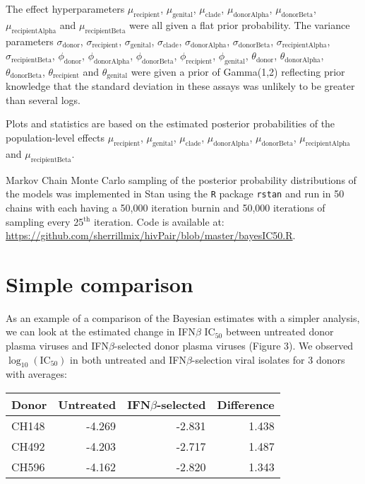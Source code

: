 \documentclass[12pt]{article}
\newcommand{\ifnb}{IFN${\beta}$}
\newcommand{\icFifty}{IC$_{50}$}
\begin{document}
The effect hyperparameters
$\mu_{\text{recipient}}$, $\mu_{\text{genital}}$, $\mu_{\text{clade}}$, $\mu_{\text{donorAlpha}}$, $\mu_{\text{donorBeta}}$, $\mu_{\text{recipientAlpha}}$ and $\mu_{\text{recipientBeta}}$ were all given a flat prior probability.
The variance parameters 
$\sigma_{\text{donor}}$, $\sigma_{\text{recipient}}$, $\sigma_{\text{genital}}$, $\sigma_{\text{clade}}$, $\sigma_{\text{donorAlpha}}$, $\sigma_{\text{donorBeta}}$, $\sigma_{\text{recipientAlpha}}$, $\sigma_{\text{recipientBeta}}$,
$\phi_{\text{donor}}$, $\phi_{\text{donorAlpha}}$, $\phi_{\text{donorBeta}}$, $\phi_{\text{recipient}}$, $\phi_{\text{genital}}$,
$\theta_{\text{donor}}$, $\theta_{\text{donorAlpha}}$, $\theta_{\text{donorBeta}}$, $\theta_{\text{recipient}}$ and $\theta_{\text{genital}}$ 
were given a prior of Gamma(1,2) reflecting prior knowledge that the standard deviation in these assays was unlikely to be greater than several logs.

Plots and statistics are based on the estimated posterior probabilities of the population-level effects
$\mu_{\text{recipient}}$, $\mu_{\text{genital}}$, $\mu_{\text{clade}}$, $\mu_{\text{donorAlpha}}$, $\mu_{\text{donorBeta}}$, $\mu_{\text{recipientAlpha}}$ and $\mu_{\text{recipientBeta}}$.

Markov Chain Monte Carlo sampling of the posterior probability distributions of the models was implemented in Stan using the \texttt{R} package \texttt{rstan}
  and run in 50 chains with each having a 50,000 iteration burnin and 50,000 iterations of sampling every 25$^{\text{th}}$ iteration.
  Code is available at:\\
  \url{https://github.com/sherrillmix/hivPair/blob/master/bayesIC50.R}.

\section{Simple comparison}
As an example of a comparison of the Bayesian estimates with a simpler analysis, we can look at the estimated change in \ifnb{} \icFifty{} between untreated donor plasma viruses and \ifnb-selected donor plasma viruses (Figure 3). We observed $\log_{10}(\text{\icFifty})$ in both untreated and \ifnb-selection viral isolates for 3 donors with averages:
\begin{table}[ht]
\centering
  \begin{tabular}{|l|r|r|r|}
    \hline
    Donor  & Untreated & \ifnb{}-selected & Difference \\ 
    \hline
    CH148  & -4.269    & -2.831           & 1.438      \\ 
    CH492  & -4.203    & -2.717           & 1.487      \\ 
    CH596  & -4.162    & -2.820           & 1.343      \\ 
    \hline
  \end{tabular}\\
\end{table}
\end{document}
